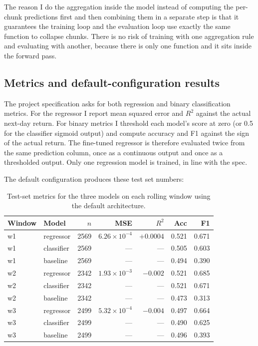 \documentclass[11pt]{article}
\begin{document}
The reason I do the aggregation inside the model instead of computing the per-chunk predictions first and then combining them in a separate step is that it guarantees the training loop and the evaluation loop use exactly the same function to collapse chunks. There is no risk of training with one aggregation rule and evaluating with another, because there is only one function and it sits inside the forward pass.

\subsection{Metrics and default-configuration results}

The project specification asks for both regression and binary classification metrics. For the regressor I report mean squared error and $R^2$ against the actual next-day return. For binary metrics I threshold each model's score at zero (or 0.5 for the classifier sigmoid output) and compute accuracy and F1 against the sign of the actual return. The fine-tuned regressor is therefore evaluated twice from the same prediction column, once as a continuous output and once as a thresholded output. Only one regression model is trained, in line with the spec.

The default configuration produces these test set numbers:

\begin{table}[h]
\centering
\small
\begin{tabular}{llrrrrr}
\toprule
Window & Model & $n$ & MSE & $R^2$ & Acc & F1 \\
\midrule
w1 & regressor  & 2569 & $6.26{\times}10^{-4}$ & $+0.0004$ & 0.521 & 0.671 \\
w1 & classifier & 2569 & --- & --- & 0.505 & 0.603 \\
w1 & baseline   & 2569 & --- & --- & 0.494 & 0.390 \\
w2 & regressor  & 2342 & $1.93{\times}10^{-3}$ & $-0.002$ & 0.521 & 0.685 \\
w2 & classifier & 2342 & --- & --- & 0.521 & 0.671 \\
w2 & baseline   & 2342 & --- & --- & 0.473 & 0.313 \\
w3 & regressor  & 2499 & $5.32{\times}10^{-4}$ & $-0.004$ & 0.497 & 0.664 \\
w3 & classifier & 2499 & --- & --- & 0.490 & 0.625 \\
w3 & baseline   & 2499 & --- & --- & 0.496 & 0.393 \\
\bottomrule
\end{tabular}
\caption{Test-set metrics for the three models on each rolling window using the default architecture.}
\label{tab:default_results}
\end{table}
\end{document}
